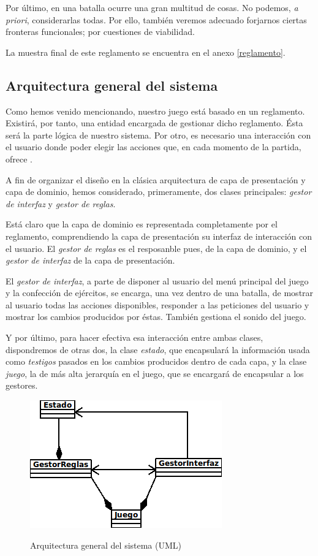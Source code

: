 Por último, en una batalla ocurre una gran multitud de cosas. No
podemos, \emph{a priori}, considerarlas todas. Por ello, también
veremos adecuado forjarnos ciertas fronteras funcionales; por
cuestiones de viabilidad.

La muestra final de este reglamento se encuentra en el anexo
\ref{reglamento}.

\subsection{Arquitectura general del sistema}
Como hemos venido mencionando, nuestro juego está basado en un
reglamento. Existirá, por tanto, una entidad encargada de gestionar
dicho reglamento. Ésta será la parte lógica de nuestro sistema. Por
otro, es necesario una interacción con el usuario donde poder elegir
las acciones que, en cada momento de la partida, ofrece \gomf.

A fin de organizar el diseño en la clásica arquitectura de capa de
presentación y capa de dominio, hemos considerado, primeramente, dos
clases principales: \emph{gestor de interfaz} y \emph{gestor de
  reglas}.

Está claro que la capa de dominio es representada completamente por
el reglamento, comprendiendo la capa de presentación su interfaz de
interacción con el usuario. El
\emph{gestor de reglas} es el resposanble pues, de la capa de dominio,
y el \emph{gestor de interfaz} de la capa de presentación.

El \emph{gestor de interfaz}, a parte de disponer al usuario del menú
principal del juego y la confección de ejércitos, se encarga, una vez
dentro de una batalla, de mostrar al usuario todas las acciones
disponibles, responder a las peticiones del usuario y mostrar los
cambios producidos por éstas. También gestiona el sonido del juego.

Y por último, para hacer efectiva esa interacción entre ambas clases,
dispondremos de otras dos, la clase \emph{estado}, que encapsulará la
información usada como \emph{testigos} pasados en los cambios
producidos dentro de cada capa, y la clase \emph{juego}, la de más
alta jerarquía en el juego, que se encargará de encapsular a los
gestores.

\begin{figure}[h]
\centering
\includegraphics[scale=.8]{./imagenes/DiagramaJuego.png}
\label{fig:arqgen}
\caption{Arquitectura general del sistema (UML)}
\end{figure}

